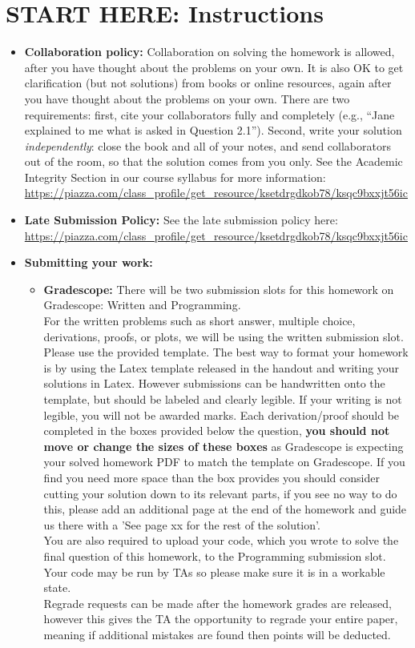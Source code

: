 \documentclass[12pt]{article}
\begin{document}
\section*{START HERE: Instructions}
\begin{itemize}
\item \textbf{Collaboration policy:} Collaboration on solving the homework is allowed, after you have thought about the problems on your own. It is also OK to get clarification (but not solutions) from books or online resources, again after you have thought about the problems on your own. There are two requirements: first, cite your collaborators fully and completely (e.g., ``Jane explained to me what is asked in Question 2.1''). Second, write your solution {\em independently}: close the book and all of your notes, and send collaborators out of the room, so that the solution comes from you only.  See the Academic Integrity Section in our course syllabus for more information: \url{https://piazza.com/class_profile/get_resource/ksetdrgdkob78/ksqc9bxxjt56ic}

\item\textbf{Late Submission Policy:} See the late submission policy here: \url{https://piazza.com/class_profile/get_resource/ksetdrgdkob78/ksqc9bxxjt56ic}

\item\textbf{Submitting your work:} 

\begin{itemize}

\item \textbf{Gradescope:} There will be two submission slots for this homework on Gradescope: Written and Programming. \\
For the written problems such as short answer, multiple choice, derivations, proofs, or plots, we will be using the written submission slot. Please use the provided template. The best way to format your homework is by using the Latex template released in the handout and writing your solutions in Latex. However submissions can be handwritten onto the template, but should be labeled and clearly legible. If your writing is not legible, you will not be awarded marks.  Each derivation/proof should be  completed in the boxes provided below the question, \textbf{you should not move or change the sizes of these boxes} as Gradescope is expecting your solved homework PDF to match the template on Gradescope. If you find you need more space than the box provides you should consider cutting your solution down to its relevant parts, if you see no way to do this, please add an additional page at the end of the homework and guide us there with a 'See page xx for the rest of the solution'.\\
You are also required to upload your code, which you wrote to solve the final question of this homework, to the Programming submission slot. Your code may be run by TAs so please make sure it is in a workable state.\\
Regrade requests can be made after the homework grades are released, however this gives the TA the opportunity to regrade your entire paper, meaning if additional mistakes are found then points will be deducted. 
\end{itemize}


\end{itemize}
\end{document}
